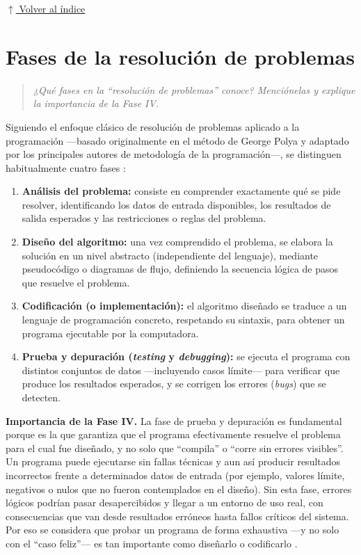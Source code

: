 \documentclass[12pt]{article}
\newcommand{\volverindice}{%
    \vspace{1em}%
    \begin{flushright}%
        \hyperlink{indice}{\small $\uparrow$ Volver al índice}%
    \end{flushright}%
}
\newcommand{\enunciado}[1]{%
    \begin{quote}
        \itshape #1
    \end{quote}
}
\begin{document}
\volverindice
\newpage


\section{Fases de la resolución de problemas}

\enunciado{¿Qué fases en la \enquote{resolución de problemas} conoce? Menciónelas y explique la importancia de la Fase IV.}

Siguiendo el enfoque clásico de resolución de problemas aplicado a la programación —basado originalmente en el método de George Polya y adaptado por los principales autores de metodología de la programación—, se distinguen habitualmente cuatro fases \parencite{cairo2005metodologia}:

\begin{enumerate}
    \item \textbf{Análisis del problema:} consiste en comprender exactamente qué se pide resolver, identificando los datos de entrada disponibles, los resultados de salida esperados y las restricciones o reglas del problema.
    \item \textbf{Diseño del algoritmo:} una vez comprendido el problema, se elabora la solución en un nivel abstracto (independiente del lenguaje), mediante pseudocódigo o diagramas de flujo, definiendo la secuencia lógica de pasos que resuelve el problema.
    \item \textbf{Codificación (o implementación):} el algoritmo diseñado se traduce a un lenguaje de programación concreto, respetando su sintaxis, para obtener un programa ejecutable por la computadora.
    \item \textbf{Prueba y depuración (\emph{testing} y \emph{debugging}):} se ejecuta el programa con distintos conjuntos de datos —incluyendo casos límite— para verificar que produce los resultados esperados, y se corrigen los errores (\emph{bugs}) que se detecten.
\end{enumerate}

\textbf{Importancia de la Fase IV.} La fase de prueba y depuración es fundamental porque es la que garantiza que el programa efectivamente resuelve el problema para el cual fue diseñado, y no solo que \enquote{compila} o \enquote{corre sin errores visibles}. Un programa puede ejecutarse sin fallas técnicas y aun así producir resultados incorrectos frente a determinados datos de entrada (por ejemplo, valores límite, negativos o nulos que no fueron contemplados en el diseño). Sin esta fase, errores lógicos podrían pasar desapercibidos y llegar a un entorno de uso real, con consecuencias que van desde resultados erróneos hasta fallos críticos del sistema. Por eso se considera que probar un programa de forma exhaustiva —y no solo con el \enquote{caso feliz}— es tan importante como diseñarlo o codificarlo \parencite{joyanes2008fundamentos}.
\end{document}
